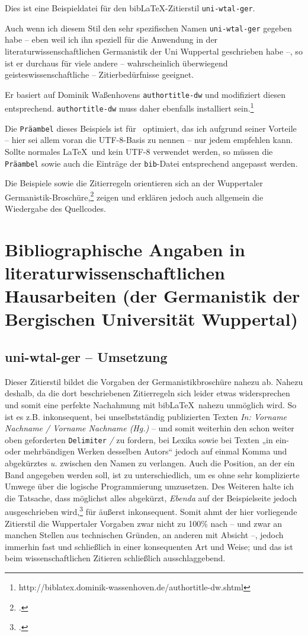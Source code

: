 \documentclass[12pt,notitlepage,parskip]{scrartcl}
\begin{document}
Dies ist eine Beispieldatei für den bib\LaTeX-Zitierstil \texttt{uni-wtal-ger}.

Auch wenn ich diesem Stil den sehr spezifischen Namen \texttt{uni-wtal-ger}
gegeben habe – eben weil ich ihn speziell für die Anwendung in der
literaturwissenschaftlichen Germanistik der Uni Wuppertal geschrieben habe –, so
ist er durchaus für viele andere – wahrscheinlich überwiegend
geisteswissenschaftliche – Zitierbedürfnisse geeignet.

Er basiert auf Dominik Waßenhovens \texttt{authortitle-dw} und modifiziert
diesen entsprechend. \texttt{authortitle-dw} muss daher ebenfalls installiert
sein.\footnote{http://biblatex.dominik-wassenhoven.de/authortitle-dw.shtml}

Die \texttt{Präambel} dieses Beispiels ist für \XeTeX\ optimiert, das ich
aufgrund seiner Vorteile – hier sei allem voran die UTF-8-Basis zu nennen – nur
jedem empfehlen kann. Sollte normales \LaTeX\ und kein UTF-8 verwendet werden,
so müssen die \texttt{Präambel} sowie auch die Einträge der \texttt{bib}-Datei
entsprechend angepasst werden.

Die Beispiele sowie die Zitierregeln orientieren sich an der Wuppertaler
Germanistik-Broschüre,\Footcite[Vgl.][38-42]{germanistik} zeigen und erklären
jedoch auch allgemein die Wiedergabe des Quellcodes.

\section{Bibliographische Angaben in literaturwissenschaftlichen Hausarbeiten
(der Germanistik der Bergischen Universität Wuppertal)}

\subsection{uni-wtal-ger – Umsetzung}
Dieser Zitierstil bildet die Vorgaben der Germanistikbroschüre nahezu ab.
Nahezu deshalb, da die dort beschriebenen Zitierregeln sich leider etwas
widersprechen und somit eine perfekte Nachahmung mit bib\LaTeX\ nahezu unmöglich
wird. So ist es z.B. inkonsequent, bei unselbstständig publizierten Texten
\textit{In:
Vorname Nachname / Vorname Nachname (Hg.)} – und somit weiterhin den schon
weiter oben geforderten \texttt{Delimiter} \textit{/} zu fordern, bei Lexika
sowie bei Texten „in ein- oder mehrbändigen Werken desselben Autors“ jedoch auf
einmal Komma und abgekürztes \textit{u.} zwischen den Namen zu verlangen. Auch
die Position, an der ein Band angegeben werden soll, ist zu unterschiedlich, um
es ohne sehr komplizierte Umwege über die logische Programmierung umzusetzen.
Des Weiteren halte ich die Tatsache, dass möglichst alles abgekürzt,
\textit{Ebenda} auf der Beispielseite jedoch ausgeschrieben
wird,\Footcite[Vgl.][48]{germanistik} für äußerst inkonsequent. Somit ahmt der
hier vorliegende Zitierstil die Wuppertaler Vorgaben zwar nicht zu 100\% nach –
und zwar an manchen Stellen aus technischen Gründen, an anderen mit Absicht –,
jedoch immerhin fast und schließlich in einer konsequenten Art und Weise; und
das ist beim wissenschaftlichen Zitieren schließlich ausschlaggebend.
\end{document}
